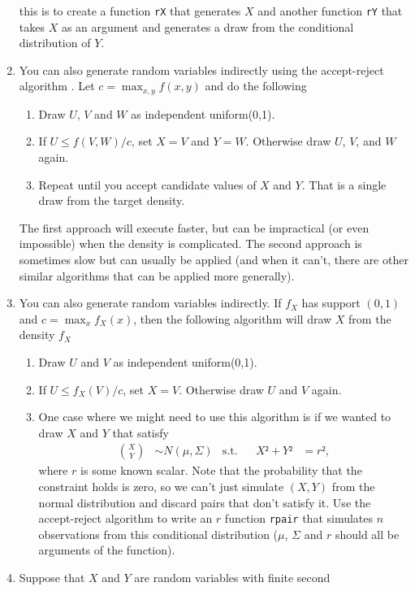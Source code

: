 \begin{enumerate}
  this is to create a function \texttt{rX} that generates $X$ and
  another function \texttt{rY} that takes $X$ as an argument and
  generates a draw from the conditional distribution of $Y$.
\item You can also generate random variables indirectly using the
  accept-reject algorithm \citep[Section 5.6.2]{CaB_2001}. Let $c =
  \max_{x,y} f(x,y)$ and do the following
  \begin{enumerate}
  \item Draw $U$, $V$ and $W$ as independent uniform(0,1).
  \item If $U ≤ f(V,W) / c$, set $X=V$ and $Y=W$.  Otherwise draw $U$,
    $V$, and $W$ again.
  \item Repeat until you accept candidate values of $X$ and $Y$. That
    is a single draw from the target density.
  \end{enumerate}
  The first approach will execute faster, but can be impractical (or
  even impossible) when the density is complicated. The second
  approach is sometimes slow but can usually be applied (and when it
  can't, there are other similar algorithms that can be applied more
  generally).
\item You can also generate random variables indirectly.  If $f_X$ has
  support $(0,1)$ and $c = \max_x f_X(x)$, then the following
  algorithm will draw $X$ from the density $f_X$ \citep[see][Section
  5.6.2]{CaB_2001}
  \begin{enumerate}
  \item Draw $U$ and $V$ as independent uniform(0,1).
  \item If $U ≤ f_X(V) / c$, set $X = V$.  Otherwise draw $U$ and $V$
    again.
  \item One case where we might need to use this algorithm is if we
    wanted to draw $X$ and $Y$ that satisfy
    \begin{align}\label{eq:prob_1}
      \binom{X}{Y} &∼ N(μ,Σ) & \text{s.t.}&& X² + Y² &= r²,
    \end{align}
    where $r$ is some known scalar.  Note that the probability that
    the constraint holds is zero, so we can't just simulate $(X,Y)$
    from the normal distribution and discard pairs that don't satisfy
    it.  Use the accept-reject algorithm to write an $r$ function
    \texttt{rpair} that simulates $n$ observations from this
    conditional distribution ($μ$, $Σ$ and $r$ should all be arguments
    of the function).
  \end{enumerate}
\item Suppose that $X$ and $Y$ are random variables with finite second

\end{enumerate}
